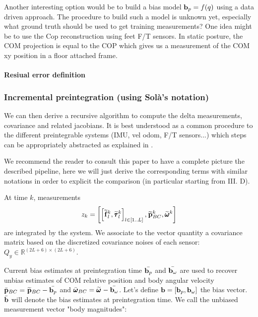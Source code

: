 \documentclass[11pt]{article}
\newcommand{\bias}{\bfb}
\newcommand{\posim}[2]{\prescript{#1}{}{\widetilde{\bfp}}_{#2}}
\newcommand{\posibar}{\bar{\bfp}}
\newcommand{\angvelm}[2]{\prescript{#1}{}{\widetilde{\pmb{\omega}}}_{#2}}
\newcommand{\angvelbar}{\bar{\pmb{\omega}}}
\newcommand{\forcem}[2]{\prescript{#1}{}{\widetilde{\bff}}_{#2}}
\newcommand{\torquem}[2]{\prescript{#1}{}{\widetilde{\pmb{\tau}}}_{#2}}
\newcommand{\Reals}{\mathbb{R}}
\begin{document}
Another interesting option would be to build a bias model $\bias_p = f(q)$ using a data driven approach. The procedure to build such a model is unknown yet, especially what ground truth should be used to get training measurements? One idea might be to use the Cop reconstruction using feet F/T sensors. In static posture, the COM projection is equal to the COP which gives us a measurement of the COM xy position in a floor attached frame.





\paragraph{Resiual error definition}


\subsubsection{Incremental preintegration (using Solà's notation)}
We can then derive a recursive algorithm to compute the delta measurements, covariance and related jacobians. It is best understood as a common procedure to the different preintegrable systems (IMU, vel odom, F/T sensors...) which steps can be appropriately abstracted as explained in \cite{atchuthan2018odometry}.  

We recommend the reader to consult this paper to have a complete picture the described pipeline, here we will just derive the corresponding terms with similar notations in order to explicit the comparison (in particular starting from III. D).

At time $k$, measurements
%
\begin{equation}
    z_k = \left[\left[\forcem{}{l}^k, \torquem{}{l}^k \right]_{l \in [1..L]}, \posim{}{BC}^k, \angvelm{}{}^k\right]
\end{equation}
%
are integrated by the system. We associate to the vector quantity a covariance matrix based on the discretized covariance noises of each sensor: $Q_{y} \in \Reals^{(2L+6) \times (2L+6)}$.

Current bias estimates at preintegration time $\bar{\bias_p}$ and $\bar{\bias_{\omega}}$ are used to recover unbias estimates of COM relative position and body angular velocity $\posibar_{BC} = \posim{}{BC} - \bar{\bias_p}$ and $\angvelbar_{BC} = \angvelm{}{} - \bar{\bias_{\omega}}$. Let's define $\bias = \left[\bias_p, \bias_{\omega} \right]$ the bias vector. $\bar{\bias}$ will denote the bias estimates at preintegration time. We call the unbiased measurement vector "body magnitudes":
\end{document}
